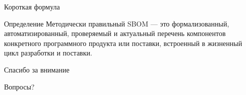 \documentclass[aspectratio=169,10pt]{beamer}
\begin{document}
\begin{frame}{Короткая формула}
\begin{block}{Определение}
Методически правильный SBOM — это формализованный, автоматизированный, проверяемый и актуальный перечень компонентов конкретного программного продукта или поставки, встроенный в жизненный цикл разработки и поставки.
\end{block}

\vspace{1em}

\begin{center}
\Large Спасибо за внимание
\end{center}
\end{frame}

\begin{frame}
\begin{center}
\Huge Вопросы?
\end{center}
\end{frame}
\end{document}
